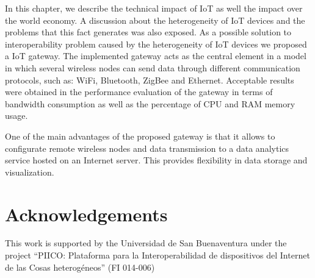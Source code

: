 In this chapter, we describe the technical impact of IoT as well the impact over the world economy. A discussion about the heterogeneity of IoT devices and the problems that this fact generates was also exposed. As a possible solution to interoperability problem caused by the heterogeneity of IoT devices we proposed a IoT gateway. The implemented gateway acts as the central element in a model in which several wireless nodes can send data through different communication protocols, such as: WiFi, Bluetooth, ZigBee and Ethernet. Acceptable results were obtained in the performance evaluation of the gateway in terms of bandwidth consumption as well as the percentage of CPU and RAM memory usage.

One of the main advantages of the proposed gateway is that it allows to configurate remote wireless nodes and data transmission to a data analytics service hosted on an Internet server. This provides flexibility in data storage and visualization.

\section*{Acknowledgements}
 This work is supported by the Universidad de San Buenaventura under the project “PIICO: Plataforma para la Interoperabilidad de dispositivos del Internet de las Cosas heterog\'eneos” (FI 014-006)